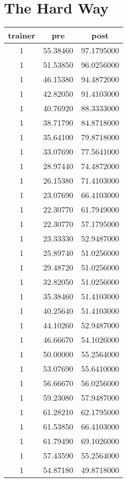 \documentclass[
]{book}
\begin{document}
\hypertarget{the-hard-way}{%
\section{The Hard Way}\label{the-hard-way}}

\begin{tabular}{c|c|c}
\hline
trainer & pre & post\\
\hline
1 & 55.38460 & 97.1795000\\
\hline
1 & 51.53850 & 96.0256000\\
\hline
1 & 46.15380 & 94.4872000\\
\hline
1 & 42.82050 & 91.4103000\\
\hline
1 & 40.76920 & 88.3333000\\
\hline
1 & 38.71790 & 84.8718000\\
\hline
1 & 35.64100 & 79.8718000\\
\hline
1 & 33.07690 & 77.5641000\\
\hline
1 & 28.97440 & 74.4872000\\
\hline
1 & 26.15380 & 71.4103000\\
\hline
1 & 23.07690 & 66.4103000\\
\hline
1 & 22.30770 & 61.7949000\\
\hline
1 & 22.30770 & 57.1795000\\
\hline
1 & 23.33330 & 52.9487000\\
\hline
1 & 25.89740 & 51.0256000\\
\hline
1 & 29.48720 & 51.0256000\\
\hline
1 & 32.82050 & 51.0256000\\
\hline
1 & 35.38460 & 51.4103000\\
\hline
1 & 40.25640 & 51.4103000\\
\hline
1 & 44.10260 & 52.9487000\\
\hline
1 & 46.66670 & 54.1026000\\
\hline
1 & 50.00000 & 55.2564000\\
\hline
1 & 53.07690 & 55.6410000\\
\hline
1 & 56.66670 & 56.0256000\\
\hline
1 & 59.23080 & 57.9487000\\
\hline
1 & 61.28210 & 62.1795000\\
\hline
1 & 61.53850 & 66.4103000\\
\hline
1 & 61.79490 & 69.1026000\\
\hline
1 & 57.43590 & 55.2564000\\
\hline
1 & 54.87180 & 49.8718000\\

\end{tabular}
\end{document}
